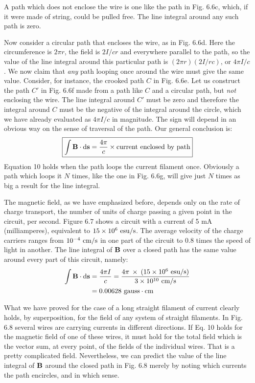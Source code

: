 A path which does not enclose the wire is one like the path in
Fig. 6.6c, which, if it were made of string, could be pulled free. The
line integral around any such path is zero.

Now consider a circular path that encloses the wire, as in Fig. 6.6d.
Here the circumference is $2\pi r$, the field is $2I/cr$ and everywhere parallel
to the path, so the value of the line integral around this particular
path is $(2\pi r)(2I/rc)$, or $4\pi I/c$. We now claim that \emph{any} path looping
once around the wire must give the same value. Consider, for instance,
the crooked path $C$ in Fig. 6.6e. Let us construct the path $C'$
in Fig. 6.6f made from a path like $C$ and a circular path, but \emph{not}
enclosing the wire. The line integral around $C'$ must be zero and therefore
the integral around $C$ must be the negative of the integral around
the circle, which we have already evaluated as $4\pi I/c$ in magnitude.
The sign will depend in an obvious way on the sense of traversal of
the path. Our general conclusion is:
\begin{equation*}
\boxed{
  \int \mathbf{B}\cdot\textup{d}\mathbf{s} = \frac{4\pi}{c} \times \text{current enclosed by path}
}
\end{equation*}
Equation 10 holds when the path loops the current filament once.
Obviously a path which loops it $N$ times, like the one in Fig. 6.6g, will
give just $N$ times as big a result for the line integral.

The magnetic field, as we have emphasized before, depends only
on the rate of charge transport, the number of units of charge passing
a given point in the circuit, per second. Figure 6.7 shows a circuit
with a current of 5 mA (milliamperes), equivalent to $15 \times 10^6\ \textup{esu}/\textup{s}$.
The average velocity of the charge carriers ranges from
$10^{-4}\ \textup{cm}/\textup{s}$ in one part of the circuit to 0.8 times the speed of light
in another. The line integral of $\mathbf{B}$ over a closed path has the same
value around every part of this circuit, namely:
\begin{align*}
\begin{split}
  \int \vc{B}\cdot\der\vc{s} &= \frac{4\pi I}{c}
        = \frac{4\pi \:\times\: (15\times10^6\ \esu/\sunit)}{3\times10^{10}\ \cmunit/\sunit} \\
    &= 0.00628\ \zu{gauss}\cdot\cmunit
\end{split}
\end{align*}

What we have proved for the case of a long straight filament of
current clearly holds, by superposition, for the field of any system
of straight filaments. In Fig. 6.8 several wires are carrying currents
in different directions. If Eq. 10 holds for the magnetic field of one
of these wires, it must hold for the total field which is the vector sum,
at every point, of the fields of the individual wires. That is a pretty
complicated field. Nevertheless, we can predict the value of the line
integral of $\mathbf{B}$ around the closed path in Fig. 6.8 merely by noting
which currents the path encircles, and in which sense.

